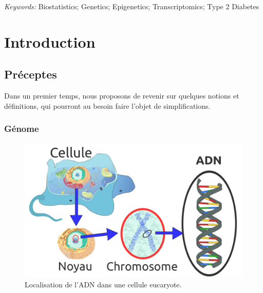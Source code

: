 \documentclass[11pt,a4paper,notrimn]{krantz}
\theoremstyle{definition}
\theoremstyle{definition}
\theoremstyle{remark}
\begin{document}
\emph{Keywords:} Biostatistics; Genetics; Epigenetics; Transcriptomics;
Type 2 Diabetes

\normalsize {}

\mainmatter

\chapter*{Introduction}\label{introduction}


\section{Préceptes}\label{preceptes}

Dans un premier temps, nous proposons de revenir sur quelques notions et
définitions, qui pourront au besoin faire l'objet de simplifications.

\subsection{Génome}\label{genome}



\begin{figure}[!htb]

{\centering \includegraphics[width=6in]{FiguresTables/Eukaryote_DNA} 

}

\caption{Localisation de l'ADN dans une cellule eucaryote.}\label{fig:EukaryoteDNA}
\end{figure}
\end{document}
